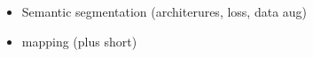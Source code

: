 \begin{itemize}
	\item Semantic segmentation (architerures, loss, data aug)
	\item mapping (plus short)
\end{itemize}